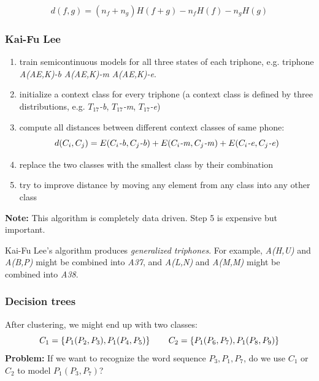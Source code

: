 \[
    d(f, g) = (n_f + n_g) H(f + g) - n_f H(f) - n_g H(g)
\]

\subsubsection{Kai-Fu Lee}
\begin{enumerate}
    \item train semicontinuous models for all three states of each triphone, e.g. triphone \textit{A(AE,K)-b} \textit{A(AE,K)-m} \textit{A(AE,K)-e}.
    \item initialize a context class for every triphone (a context class is defined by three distributions, e.g. \textit{$T_{17}$-b}, \textit{$T_{17}$-m}, \textit{$T_{17}$-e})
    \item compute all distances between different context classes of same phone:
        \[
            d(C_i, C_j) = E(C_i\mbox{\textit{-b}}, C_j\mbox{\textit{-b}}) + E(C_i\mbox{\textit{-m}}, C_j\mbox{\textit{-m}}) + E(C_i\mbox{\textit{-e}}, C_j\mbox{\textit{-e}})
        \]
    \item replace the two classes with the smallest class by their combination
    \item try to improve distance by moving any element from any class into any other class
\end{enumerate}

\vspace{10pt}
\textbf{Note:} This algorithm is completely data driven. Step 5 is expensive but important.
\vspace{10pt}

Kai-Fu Lee's algorithm produces \textit{generalized triphones}. For example, \textit{A(H,U)} and \textit{A(B,P)} might be combined into \textit{A37}, and \textit{A(L,N)} and \textit{A(M,M)} might be combined into \textit{A38}.

\subsubsection{Decision trees}

After clustering, we might end up with two classes:
\[
    C_1 = \left\{P_1(P_2, P_3), P_1(P_4, P_5) \right\} \mbox{\hspace{20pt}} C_2 = \left\{P_1(P_6, P_7), P_1(P_8, P_9) \right\}
\]
\textbf{Problem:} If we want to recognize the word sequence $P_3, P_1, P_7$, do we use $C_1$ or $C_2$ to model $P_1(P_3, P_7)$?

\vspace{5pt}

